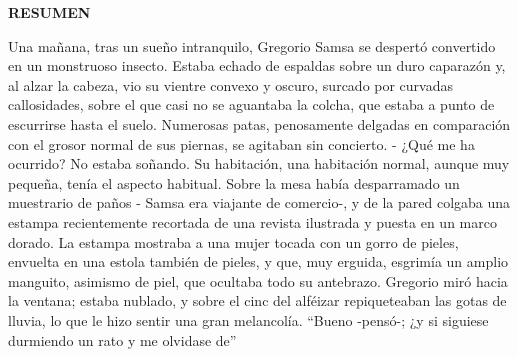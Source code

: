 \begin{center}
{\LARGE \bfseries RESUMEN}

\vspace{2.5cm}
\end{center}


Una mañana, tras un sueño intranquilo, Gregorio Samsa se despertó convertido en
un monstruoso insecto. Estaba echado de espaldas sobre un duro caparazón y, al
alzar la cabeza, vio su vientre convexo y oscuro, surcado por curvadas
callosidades, sobre el que casi no se aguantaba la colcha, que estaba a punto de
escurrirse hasta el suelo. Numerosas patas, penosamente delgadas en comparación
con el grosor normal de sus piernas, se agitaban sin concierto. - ¿Qué me ha
ocurrido? No estaba soñando. Su habitación, una habitación normal, aunque muy
pequeña, tenía el aspecto habitual. Sobre la mesa había desparramado un
muestrario de paños - Samsa era viajante de comercio-, y de la pared colgaba una
estampa recientemente recortada de una revista ilustrada y puesta en un marco
dorado. La estampa mostraba a una mujer tocada con un gorro de pieles, envuelta
en una estola también de pieles, y que, muy erguida, esgrimía un amplio
manguito, asimismo de piel, que ocultaba todo su antebrazo. Gregorio miró hacia
la ventana; estaba nublado, y sobre el cinc del alféizar repiqueteaban las gotas
de lluvia, lo que le hizo sentir una gran melancolía. ``Bueno -pensó-; ¿y si
siguiese durmiendo un rato y me olvidase de''
